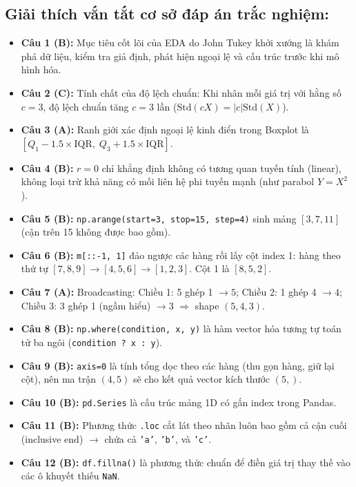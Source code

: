 \documentclass[11pt,a4paper]{article}
\begin{document}
\subsection*{Giải thích vắn tắt cơ sở đáp án trắc nghiệm:}
\begin{itemize}[leftmargin=*,itemsep=1.5pt]
  \item \textbf{Câu 1 (B):} Mục tiêu cốt lõi của EDA do John Tukey khởi xướng là khám phá dữ liệu, kiểm tra giả định, phát hiện ngoại lệ và cấu trúc trước khi mô hình hóa.
  \item \textbf{Câu 2 (C):} Tính chất của độ lệch chuẩn: Khi nhân mỗi giá trị với hằng số $c = 3$, độ lệch chuẩn tăng $c = 3$ lần ($\text{Std}(cX) = |c|\text{Std}(X)$).
  \item \textbf{Câu 3 (A):} Ranh giới xác định ngoại lệ kinh điển trong Boxplot là $[Q_1 - 1.5\times\text{IQR}, \; Q_3 + 1.5\times\text{IQR}]$.
  \item \textbf{Câu 4 (B):} $r = 0$ chỉ khẳng định không có tương quan tuyến tính (linear), không loại trừ khả năng có mối liên hệ phi tuyến mạnh (như parabol $Y = X^2$).
  \item \textbf{Câu 5 (B):} \texttt{np.arange(start=3, stop=15, step=4)} sinh mảng $[3, 7, 11]$ (cận trên 15 không được bao gồm).
  \item \textbf{Câu 6 (B):} \texttt{m[::-1, 1]} đảo ngược các hàng rồi lấy cột index 1: hàng theo thứ tự $[7, 8, 9] \rightarrow [4, 5, 6] \rightarrow [1, 2, 3]$. Cột 1 là $[8, 5, 2]$.
  \item \textbf{Câu 7 (A):} Broadcasting: Chiều 1: 5 ghép 1 $\rightarrow 5$; Chiều 2: 1 ghép 4 $\rightarrow 4$; Chiều 3: 3 ghép 1 (ngầm hiểu) $\rightarrow 3$ $\Rightarrow$ shape $(5, 4, 3)$.
  \item \textbf{Câu 8 (B):} \texttt{np.where(condition, x, y)} là hàm vector hóa tương tự toán tử ba ngôi (\texttt{condition ? x : y}).
  \item \textbf{Câu 9 (B):} \texttt{axis=0} là tính tổng dọc theo các hàng (thu gọn hàng, giữ lại cột), nên ma trận $(4, 5)$ sẽ cho kết quả vector kích thước $(5,)$.
  \item \textbf{Câu 10 (B):} \texttt{pd.Series} là cấu trúc mảng 1D có gắn index trong Pandas.
  \item \textbf{Câu 11 (B):} Phương thức \texttt{.loc} cắt lát theo nhãn luôn bao gồm cả cận cuối (inclusive end) $\rightarrow$ chứa cả \texttt{'a'}, \texttt{'b'}, và \texttt{'c'}.
  \item \textbf{Câu 12 (B):} \texttt{df.fillna()} là phương thức chuẩn để điền giá trị thay thế vào các ô khuyết thiếu \texttt{NaN}.

\end{itemize}
\end{document}
